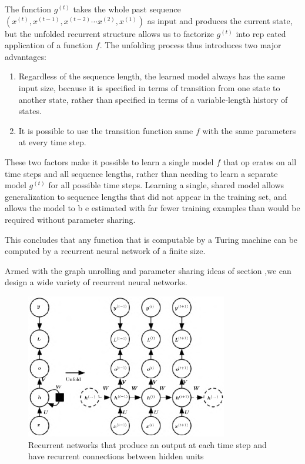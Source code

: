 \documentclass{report}
\begin{document}
The function $g^{(t)}$ takes the whole past sequence $(x^{(t)}, x^{(t-1)}, x^{(t-2)} \cdots x^{(2)}, x^{(1)})$
as input and produces the current state, but the unfolded recurrent structure
allows us to factorize $g^{(t)}$ into rep eated application of a function $f$. The unfolding
process thus introduces two major advantages:
\begin{enumerate}	
	\item Regardless of the sequence length, the learned model always has the same input size, because it is specified in terms of transition from one state to another state, rather than specified in terms of a variable-length history of states.
	\item It is possible to use the transition function same $f$ with the same parameters at every time step. 

	\end{enumerate}
These two factors make it possible to learn a single model $f$ that op erates on all time steps and all sequence lengths, rather than needing to learn a separate model $g^{(t)}$ for all possible time steps. Learning a single, shared model allows generalization to sequence lengths that did not appear in the training set, and allows the model to b e estimated with far fewer training examples than would be required without parameter sharing.

This concludes that any function that is computable by a Turing machine can be computed by a recurrent neural network of a finite size.

Armed with the graph unrolling and parameter sharing ideas of section ,we can design a wide variety of recurrent neural networks.
\begin{figure}[ht]
	\includegraphics[width=250pt]{36}
	\centering
	\caption{Recurrent networks that produce an output at each time step and have recurrent connections between hidden units}
\end{figure}
\end{document}
